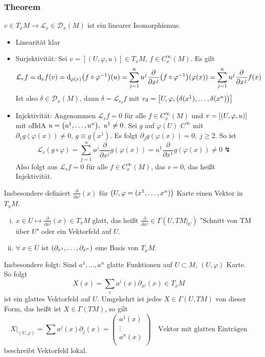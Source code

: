 \subsubsection{Theorem}
\label{ssub:150}
$v\in T_x M \to \mathcal{L}_v \in \mathcal{D}_x(M)$ ist ein linearer Isomorphismus.
\begin{itemize}
\item Linearität klar
\item Surjektivität: Sei $v = [(U,\varphi,u)] \in T_x M$, $f\in C^\infty_x (M)$. Es gilt
\[
\mathcal{L}_v f = \mathd_x f(v) = \mathd_{\varphi(x)}\enbrace*{f\circ \varphi^{-1}}(u) = \sum_{j=1}^n u^j \frac{\partial}{\partial x^j}\enbrace*{f\circ \varphi^{-1}}\enbrace*{\varphi(x)} = \sum_{j=1}^n u^j \frac{\partial}{\partial x^j} f(x) 
\]
Ist also $\delta \in \mathcal{D}_x (M)$, dann $\delta = \mathcal{L}_{v_\delta} f$ mit $v_\delta = \benbrace*{U,\varphi,\enbrace*{\delta(x^1),\ldots,\delta(x^n)}}$
\item Injektivität: Angenommen $\mathcal{L}_v f = 0$ für alle $f\in C_x^\infty (M)$ und $v = \benbrace*{\enbrace*{U,\varphi,u}}$ mit oBdA $u = \enbrace*{u^1,\ldots, u^n},\ u^1\neq 0$. 
Sei $g$ auf $\varphi(U)$ $C^\infty$ mit $\partial_1 g(\varphi(x)) \neq 0$, $g \equiv g(x^1)$. Es folgt $\partial_j g(\varphi(x)) = 0,\ j \geq 2$. So ist 
\[
\mathcal{L}_v (g\circ \varphi) = \sum_{j=1}^n u^j \frac{\partial}{\partial x^j} g(\varphi(x)) = u^1 \frac{\partial}{\partial x^1} g(\varphi(x)) \neq 0 \lightning
\]
Also folgt aus $\mathcal{L}_v f = 0$ für alle $f\in C^\infty_x (M)$, das $v = 0$, das heißt Injektivität.
\end{itemize}
Insbesondere definiert $\frac{\partial}{\partial x^j} (x)$ für $\enbrace*{U,\varphi = (x^1,\ldots, x^n)}$ Karte einen Vektor in $T_x M$.
\begin{enumerate}[(i)]
\item $x\in U \mapsto \frac{\partial}{\partial x^j}(x)\in T_x M$ glatt, das heißt $\frac{\partial}{\partial x^j} \in \Gamma(U,TM\vert_U)$ "Schnitt von TM über $U$" oder ein Vektorfeld auf $U$.
\item $\forall\ x \in U$ ist $\enbrace*{\partial_{x^1}, \ldots, \partial_{x^n}}$ eine Basis von $T_x M$.
\missingfigure{}
\end{enumerate}
Insbesondere folgt: Sind $a^1,\ldots,a^n$ glatte Funktionen auf $U\subset M$, $(U,\varphi)$ Karte. So folgt
\[
X(x) = \sum_i a^i(x) \partial_{x^j}(x) \in T_x M
\]
ist ein glattes Vektorfeld auf $U$. Umgekehrt ist jedes $X\in \Gamma(U,TM)$ von dieser Form, das heißt ist $X\in \Gamma(TM)$, so gilt
\[
X\vert_{(U,\varphi)} = \sum a^j(x) \partial_j(x) = 
\begin{pmatrix}
a^1(x)\\
\vdots \\
a^n(x)\\
\end{pmatrix}\quad \text{Vektor mit glatten Einträgen}
\]
beschreibt Vektorfeld lokal.

